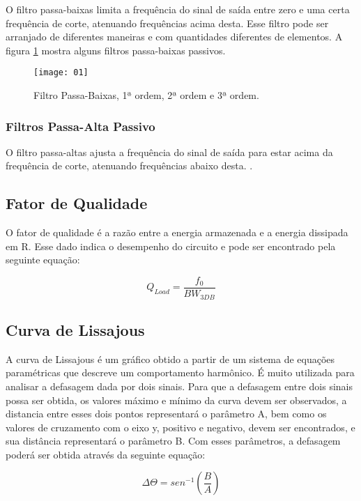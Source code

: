 O filtro passa-baixas limita a frequência do sinal de saída entre zero e uma 
certa frequência de corte, atenuando frequências acima desta. Esse filtro pode 
ser arranjado de diferentes maneiras e com quantidades diferentes de elementos.
A figura \ref{fig:03} mostra alguns filtros passa-baixas passivos.

\begin{figure}[H]
  \centering
  \caption{Filtro Passa-Baixas, 1ª ordem, 2ª ordem e 3ª ordem.}
  \texttt{[image: 01]}
  
  \label{fig:03}
\end{figure}

\subsubsection{Filtros Passa-Alta Passivo}

O filtro passa-altas ajusta a frequência do sinal de saída para estar acima da 
frequência de corte, atenuando frequências abaixo desta. \cite{Stallings}.

\subsection{Fator de Qualidade}

O fator de qualidade é a razão entre a energia armazenada e a energia dissipada 
em R. Esse dado indica o desempenho do circuito e pode ser encontrado pela 
seguinte equação:

\begin{equation}
  \label{equ:Q}
  Q_{Load} = \frac{f_0}{BW_{3DB}}
\end{equation}

\subsection{Curva de Lissajous}

A curva de Lissajous é um gráfico obtido a partir de um sistema de equações 
paramétricas que descreve um comportamento harmônico. É muito utilizada para 
analisar a defasagem dada por dois sinais.
Para que a defasagem entre dois sinais possa ser obtida, os valores máximo e 
mínimo da curva devem ser observados, a distancia entre esses dois pontos 
representará o parâmetro A, bem como os valores de cruzamento com o eixo y, 
positivo e negativo, devem ser encontrados, e sua distância representará o 
parâmetro B. Com esses parâmetros, a defasagem poderá ser obtida através da 
seguinte equação:

\begin{equation}
\label{equ:lissa}
\Delta \Theta = sen^{-1}\left(\frac{B}{A}\right)
\end{equation}
